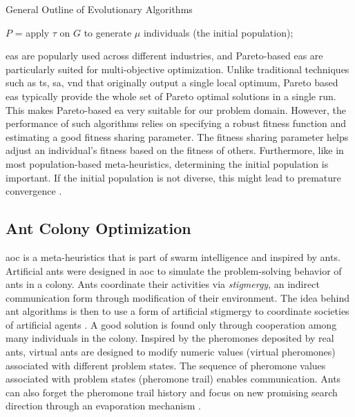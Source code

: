 \begin{algorithm}
  \caption{General Outline of Evolutionary Algorithms}\label{alg:ea}
  $P$ = apply $\tau$ on $G$ to generate $\mu$ individuals (the initial population);\\
  \end{algorithm}

\Glspl{ea} are popularly used across different industries, and Pareto-based \glspl{ea} are particularly suited for multi-objective optimization. Unlike traditional techniques such as \gls{ts}, \gls{sa}, \gls{vnd} that originally output a single local optimum, Pareto based \glspl{ea} typically provide the whole set of Pareto optimal solutions in a single run. This makes Pareto-based \gls{ea} very suitable for our problem domain. However, the performance of such algorithms relies on specifying a robust fitness function and estimating a good fitness sharing parameter. The fitness sharing parameter helps adjust an individual's fitness based on the fitness of others. Furthermore, like in most population-based meta-heuristics, determining the initial population is important. If the initial population is not diverse, this might lead to premature convergence \parencite{Talbi2009Metaheuristics:Implementation}.

\subsection{Ant Colony Optimization}
\Gls{aoc} is a meta-heuristics that is part of swarm intelligence and inspired by ants. Artificial ants were designed in \gls{aoc} to simulate the problem-solving behavior of ants in a colony. Ants coordinate their activities via \textit{stigmergy}, an indirect communication form through modification of their environment. The idea behind ant algorithms is then to use a form of artificial stigmergy to coordinate societies of artificial agents \parencite{Dorigo2018TheMetaheuristic}. A good solution is found only through cooperation among many individuals in the colony. Inspired by the pheromones deposited by real ants, virtual ants are designed to modify numeric values (virtual pheromones) associated with different problem states. The sequence of pheromone values associated with problem states (pheromone trail) enables communication. Ants can also forget the pheromone trail history and focus on new promising search direction through an evaporation mechanism \parencite{Gonzalez2007HandbookMetaheuristics}. 

